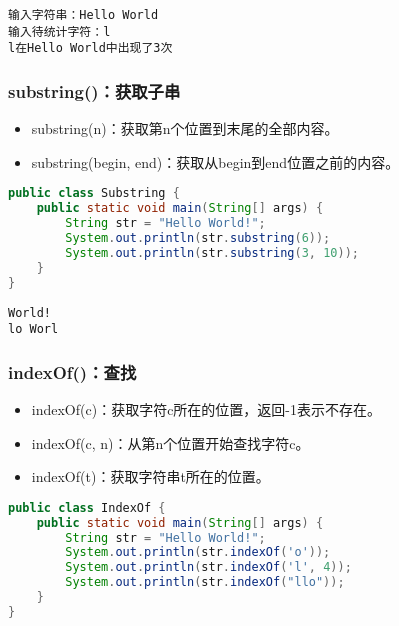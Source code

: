 \begin{tcolorbox}
	\begin{verbatim}
输入字符串：Hello World
输入待统计字符：l
l在Hello World中出现了3次
	\end{verbatim}
\end{tcolorbox}

\subsubsection{substring()：获取子串}

\begin{itemize}
	\item substring(n)：获取第n个位置到末尾的全部内容。
	\item substring(begin, end)：获取从begin到end位置之前的内容。
\end{itemize}


\begin{lstlisting}[language=Java]
public class Substring {
	public static void main(String[] args) {
		String str = "Hello World!";
		System.out.println(str.substring(6));
		System.out.println(str.substring(3, 10));
	}
}
\end{lstlisting}

\begin{tcolorbox}
	\begin{verbatim}
World!
lo Worl
	\end{verbatim}
\end{tcolorbox}

\subsubsection{indexOf()：查找}

\begin{itemize}
	\item indexOf(c)：获取字符c所在的位置，返回-1表示不存在。
	\item indexOf(c, n)：从第n个位置开始查找字符c。
	\item indexOf(t)：获取字符串t所在的位置。
\end{itemize}


\begin{lstlisting}[language=Java]
public class IndexOf {
	public static void main(String[] args) {
		String str = "Hello World!";
		System.out.println(str.indexOf('o'));
		System.out.println(str.indexOf('l', 4));
		System.out.println(str.indexOf("llo"));
	}
}
\end{lstlisting}

